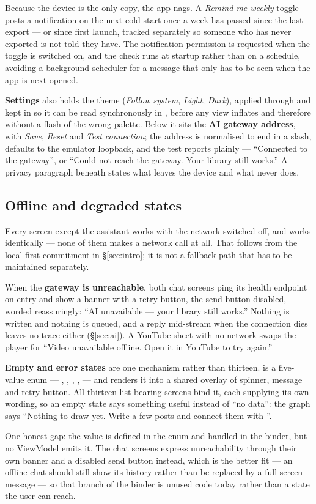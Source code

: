 Because the device is the only copy, the app nags. A \emph{Remind me weekly} toggle posts a
notification on the next cold start once a week has passed since the last export --- or since first
launch, tracked separately so someone who has never exported is not told they have. The
notification permission is requested when the toggle is switched on, and the check runs at startup
rather than on a schedule, avoiding a background scheduler for a message that only has to be seen
when the app is next opened.

\textbf{Settings} also holds the theme (\emph{Follow system}, \emph{Light}, \emph{Dark}), applied
through  and kept in  so it can be read
synchronously in , before any view inflates and therefore without a
flash of the wrong palette. Below it sits the \textbf{AI gateway address}, with \emph{Save},
\emph{Reset} and \emph{Test connection}; the address is normalised to end in a slash, defaults to
the emulator loopback, and the test reports plainly --- ``Connected to the gateway'', or ``Could not
reach the gateway. Your library still works.'' A privacy paragraph beneath states what leaves the
device and what never does.

\subsection{Offline and degraded states}

Every screen except the assistant works with the network switched off, and works identically ---
none of them makes a network call at all. That follows from the local-first commitment in
\S\ref{sec:intro}; it is not a fallback path that has to be maintained separately.

When the \textbf{gateway is unreachable}, both chat screens ping its health endpoint on entry and
show a banner with a retry button, the send button disabled, worded reassuringly: ``AI unavailable
--- your library still works.'' Nothing is written and nothing is queued, and a reply mid-stream
when the connection dies leaves no trace either (\S\ref{sec:ai}). A YouTube sheet with no network
swaps the player for ``Video unavailable offline. Open it in YouTube to try again.''

\textbf{Empty and error states} are one mechanism rather than thirteen.
 is a five-value enum --- , , ,
,  --- and  renders it into a shared overlay of
spinner, message and retry button. All thirteen list-bearing screens bind it, each supplying its
own wording, so an empty state says something useful instead of ``no data'': the graph says
``Nothing to draw yet. Write a few posts and connect them with ''.

One honest gap: the  value is defined in the enum and handled in the binder, but no
ViewModel emits it. The chat screens express unreachability through their own banner and a disabled
send button instead, which is the better fit --- an offline chat should still show its history
rather than be replaced by a full-screen message --- so that branch of the binder is unused code
today rather than a state the user can reach.
